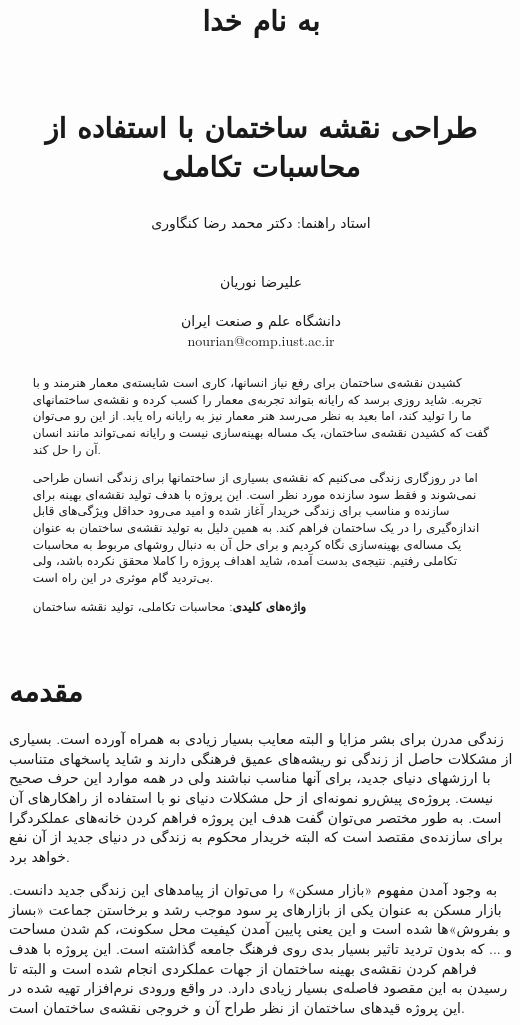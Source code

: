 \documentclass{report}
\title{ 
\begin{normalsize} به نام خدا \end{normalsize}
\\[6cm]
طراحی نقشه ساختمان با استفاده از محاسبات تکاملی
\\[2cm]
}
\author{
استاد راهنما: دکتر محمد رضا کنگاوری
\\
\\
\\
علیرضا نوریان
\\
\\ \small دانشگاه علم و صنعت ایران
\\ \small nourian@comp.iust.ac.ir
}
\begin{document}
\maketitle

\begin{abstract}
کشیدن نقشه‌ی ساختمان برای رفع نیاز انسانها، کاری است شایسته‌ی معمار هنرمند و با تجربه. شاید روزی برسد که رایانه بتواند تجربه‌ی معمار را کسب کرده و نقشه‌ی ساختمانهای ما را تولید کند، اما بعید به نظر می‌رسد هنر معمار نیز به رایانه راه یابد. از این رو می‌توان گفت که کشیدن نقشه‌ی ساختمان، یک مساله بهینه‌سازی نیست و رایانه نمی‌تواند مانند انسان آن را حل کند.

اما در روزگاری زندگی می‌کنیم که نقشه‌ی بسیاری از ساختمانها برای زندگی انسان طراحی نمی‌شوند و فقط سود سازنده مورد نظر است. این پروژه با هدف تولید نقشه‌ای بهینه برای سازنده و مناسب برای زندگی خریدار آغاز شده و امید می‌رود حداقل ویژگی‌های قابل اندازه‌گیری را در یک ساختمان فراهم کند. به همین دلیل به تولید نقشه‌ی ساختمان به عنوان یک مساله‌ی بهینه‌سازی نگاه کردیم و برای حل آن به دنبال روشهای مربوط به محاسبات تکاملی رفتیم. نتیجه‌ی بدست آمده، شاید اهداف پروژه را کاملا محقق نکرده باشد، ولی بی‌تردید گام موثری در این راه است. 

\textbf{واژه‌های کلیدی}: محاسبات تکاملی، تولید نقشه ساختمان
\end{abstract}

\tableofcontents

\section{مقدمه}
زندگی مدرن برای بشر مزایا و البته معایب بسیار زیادی به همراه آورده است. بسیاری از مشکلات حاصل از زندگی نو ریشه‌های عمیق فرهنگی دارند و شاید پاسخهای متناسب با ارزشهای دنیای جدید، برای آنها مناسب نباشند ولی در همه موارد این حرف صحیح نیست. پروژه‌ی پیش‌رو نمونه‌ای از حل مشکلات دنیای نو با استفاده از راهکارهای آن است. به طور مختصر می‌توان گفت هدف این پروژه فراهم کردن خانه‌های عملکردگرا برای سازنده‌ی مقتصد است که البته خریدار محکوم به زندگی در دنیای جدید از آن نفع خواهد برد.

به وجود آمدن مفهوم «بازار مسکن» را می‌توان از پیامدهای این زندگی جدید دانست. بازار مسکن به عنوان یکی از بازارهای پر سود موجب رشد و برخاستن جماعت «بساز و بفروش»ها شده است و این یعنی پایین آمدن کیفیت محل سکونت، کم شدن مساحت و ... که بدون تردید تاثیر بسیار بدی روی فرهنگ جامعه گذاشته است. این پروژه با هدف فراهم کردن نقشه‌ی بهینه ساختمان از جهات عملکردی انجام شده است و البته تا رسیدن به این مقصود فاصله‌ی بسیار زیادی دارد. در واقع ورودی نرم‌افزار تهیه شده در این پروژه قیدهای ساختمان از نظر طراح آن و خروجی نقشه‌ی ساختمان است.
\end{document}
